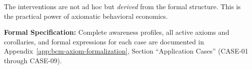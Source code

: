 The interventions are not ad hoc but \emph{derived} from the formal structure. This is the practical power of axiomatic behavioral economics.

\begin{cross-reference}
\textbf{Formal Specification:} Complete awareness profiles, all active axioms and corollaries, and formal expressions for each case are documented in Appendix~\ref{app:bcm-axiom-formalization}, Section ``Application Cases'' (CASE-01 through CASE-09).
\end{cross-reference}

